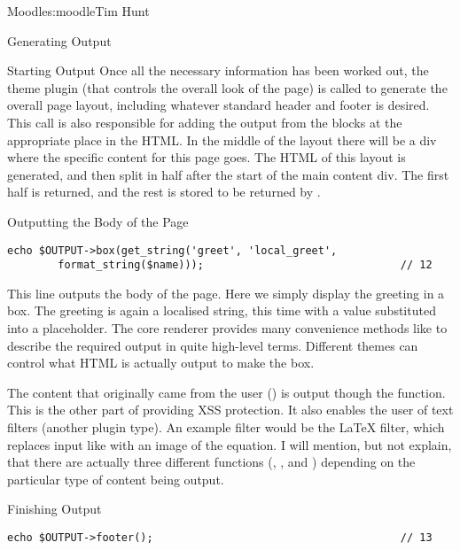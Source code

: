 \begin{aosachapter}{Moodle}{s:moodle}{Tim Hunt}
\begin{aosasect1}{Generating Output}
\begin{aosasect2}{Starting Output}
Once all the necessary information has been worked out, the theme
plugin (that controls the overall look of the page) is called to
generate the overall page layout, including whatever standard header
and footer is desired. This call is also responsible for adding the
output from the blocks at the appropriate place in the HTML. In the
middle of the layout there will be a div where the specific content
for this page goes. The HTML of this layout is generated, and then
split in half after the start of the main content div. The first half
is returned, and the rest is stored to be returned by
.

\end{aosasect2}

\begin{aosasect2}{Outputting the Body of the Page}

\begin{verbatim}
echo $OUTPUT->box(get_string('greet', 'local_greet',
        format_string($name)));                               // 12
\end{verbatim}

This line outputs the body of the page. Here we simply display the
greeting in a box. The greeting is again a localised string, this time
with a value substituted into a placeholder. The core renderer
 provides many convenience methods like  to
describe the required output in quite high-level terms. Different
themes can control what HTML is actually output to make the box.

The content that originally came from the user () is
output though the  function. This is the other
part of providing XSS protection. It also enables the user of text
filters (another plugin type). An example filter would be the LaTeX
filter, which replaces input like  with an image
of the equation. I will mention, but not explain, that there are
actually three different functions (, ,
and ) depending on the particular type of content
being output.

\end{aosasect2}

\begin{aosasect2}{Finishing Output}

\begin{verbatim}
echo $OUTPUT->footer();                                       // 13
\end{verbatim}


\end{aosasect2}
\end{aosasect1}
\end{aosachapter}
